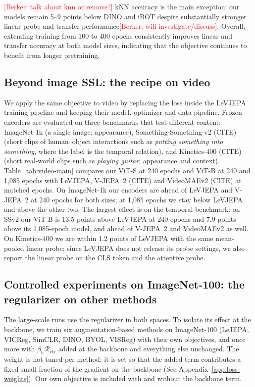 \documentclass{article} %
\theoremstyle{remark}
\newcommand{\BD}[1]{\textcolor{red}{[Berker: #1]}}
\begin{document}
\BD{talk about knn or remove?}
kNN accuracy is the main exception: our models remain 5--9 points below DINO and iBOT despite substantially stronger linear-probe and transfer performance\BD{will investigate/discuss}. Overall, extending training from 100 to 400 epochs consistently improves linear and transfer accuracy at both model sizes, indicating that the objective continues to benefit from longer pretraining.

\subsection{Beyond image SSL: the recipe on video}
\label{sec:exp-video}
We apply the same objective to video by replacing the loss inside the LeVJEPA training pipeline and keeping their model, optimizer and data pipeline. Frozen encoders are evaluated on three benchmarks that test different content: ImageNet-1k (a single image; appearance), Something-Something-v2 (CITE) (short clips of human--object interactions such as \emph{putting something into something}, where the label is the temporal relation), and Kinetics-400 (CITE) (short real-world clips such as \emph{playing guitar}; appearance and context). Table~\ref{tab:video-main} compares our ViT-S at 240 epochs and ViT-B at 240 and 1{,}085 epochs with LeVJEPA, V-JEPA~2 (CITE) and VideoMAEv2 (CITE) at matched epochs. On ImageNet-1k our encoders are ahead of LeVJEPA and V-JEPA~2 at 240 epochs for both sizes; at 1{,}085 epochs we stay below LeVJEPA and above the other two. The largest effect is on the temporal benchmark: on SSv2 our ViT-B is 13.5 points above LeVJEPA at 240 epochs and 7.9 points above its 1{,}085-epoch model, and ahead of V-JEPA~2 and VideoMAEv2 as well. On Kinetics-400 we are within 1.2 points of LeVJEPA with the same mean-pooled linear probe; since LeVJEPA does not release its probe settings, we also report the linear probe on the CLS token and the attentive probe.


\subsection{Controlled experiments on ImageNet-100: the regularizer on other methods}
\label{sec:exp-in100}
The large-scale runs use the regularizer in both spaces. To isolate its effect at the backbone, we train six augmentation-based methods on ImageNet-100 (LeJEPA, VICReg, SimCLR, DINO, BYOL, VISReg) with their own objectives, and once more with $\beta_{\mathrm{h}}\mathcal{R}_{\mathrm{ctr}}$ added at the backbone and everything else unchanged. The weight is not tuned per method: it is set so that the added term contributes a fixed small fraction of the gradient on the backbone (See Appendix~\ref{app:loss-weights}). Our own objective is included with and without the backbone term.
\end{document}
